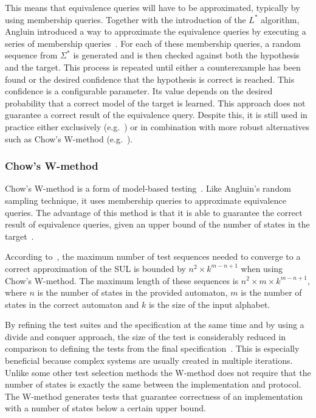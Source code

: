 This means that equivalence queries will have to be approximated, typically by
using membership queries. Together with the introduction of the $L^*$ algorithm,
Angluin introduced a way to approximate the equivalence queries by executing a
series of membership queries~\cite{Angluin1987}. For each of these membership
queries, a random sequence from $\Sigma^*$ is generated and is then checked
against both the hypothesis and the target. This process is repeated until
either a counterexample has been found or the desired confidence that the
hypothesis is correct is reached. This confidence is a configurable parameter.
Its value depends on the desired probability that a correct model of the target
is learned. This approach does not guarantee a correct result of the equivalence
query. Despite this, it is still used in practice either exclusively (e.g.~\cite{Cho2010}) or in combination with more robust alternatives such as Chow's
W-method (e.g.~\cite{Bauer2014}).

\subsubsection{Chow's W-method}
\label{sec:chow}

Chow's W-method is a form of model-based testing~\cite{deRuiter2015, Chow1978}.
Like Angluin's random sampling technique, it uses membership queries to
approximate equivalence queries. The advantage of this method is that it is able
to guarantee the correct result of equivalence queries, given an upper bound of
the number of states in the target~\cite{Ipate2007}.

According to~\cite{Vasilevskii1973}, the maximum number of test sequences needed
to converge to a correct approximation of the SUL is bounded by $n^{2} \times
k^{m-n+1}$ when using Chow's W-method. The maximum length of these sequences is
$n^{2} \times m \times k^{m-n+1}$, where $n$ is the number of states in the
provided automaton, $m$ is the number of states in the correct automaton and $k$
is the size of the input alphabet.

By refining the test suites and the specification at the same time
and by using a divide and conquer approach, the size of the test is
considerably reduced in comparison to defining the tests from
the final specification~\cite{Ipate2007, Chow1978}.
This is especially beneficial because complex systems are usually
created in multiple iterations.
Unlike some other test selection methods the W-method does not require
that the number of states is exactly the same between
the implementation and protocol.
The W-method generates tests that guarantee correctness of an
implementation with a number of states below a certain upper bound.

